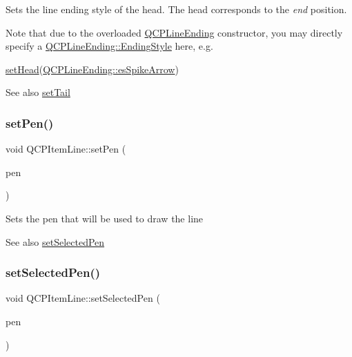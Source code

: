 Sets the line ending style of the head. The head corresponds to the {\itshape end} position.

Note that due to the overloaded \hyperlink{class_q_c_p_line_ending}{Q\+C\+P\+Line\+Ending} constructor, you may directly specify a \hyperlink{class_q_c_p_line_ending_a5ef16e6876b4b74959c7261d8d4c2cd5}{Q\+C\+P\+Line\+Ending\+::\+Ending\+Style} here, e.\+g.
\begin{DoxyCode}
\hyperlink{class_q_c_p_item_line_aebf3d687114d584e0459db6759e2c3c3}{setHead}(\hyperlink{class_q_c_p_line_ending_a5ef16e6876b4b74959c7261d8d4c2cd5a814748a589d8bf2a0b6bf8ed4a6a5376}{QCPLineEnding::esSpikeArrow}) 
\end{DoxyCode}


\begin{DoxySeeAlso}{See also}
\hyperlink{class_q_c_p_item_line_ac264222c3297a7efe33df9345c811a5f}{set\+Tail} 
\end{DoxySeeAlso}
\mbox{\label{class_q_c_p_item_line_a572528dab61c1abe205822fbd5db4b27}} 
\subsubsection{\texorpdfstring{set\+Pen()}{setPen()}}
{\footnotesize\ttfamily void Q\+C\+P\+Item\+Line\+::set\+Pen (\begin{DoxyParamCaption}\item[{const Q\+Pen \&}]{pen }\end{DoxyParamCaption})}

Sets the pen that will be used to draw the line

\begin{DoxySeeAlso}{See also}
\hyperlink{class_q_c_p_item_line_a3e2fec44503277e77717e9c24f87f1ea}{set\+Selected\+Pen} 
\end{DoxySeeAlso}
\mbox{\label{class_q_c_p_item_line_a3e2fec44503277e77717e9c24f87f1ea}} 
\subsubsection{\texorpdfstring{set\+Selected\+Pen()}{setSelectedPen()}}
{\footnotesize\ttfamily void Q\+C\+P\+Item\+Line\+::set\+Selected\+Pen (\begin{DoxyParamCaption}\item[{const Q\+Pen \&}]{pen }\end{DoxyParamCaption})}

